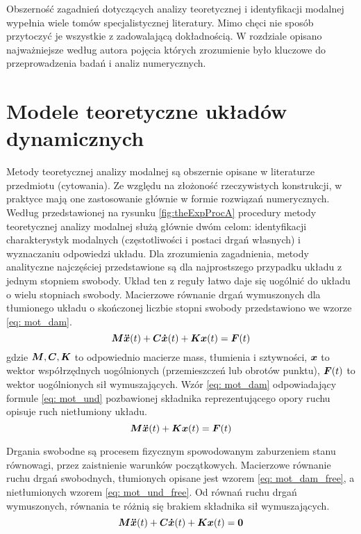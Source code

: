 Obszerność zagadnień dotyczących analizy teoretycznej i identyfikacji modalnej wypełnia wiele tomów specjalistycznej literatury. Mimo chęci nie sposób przytoczyć je wszystkie z zadowalającą dokładnością. W rozdziale opisano najważniejsze według autora pojęcia których zrozumienie było kluczowe do  przeprowadzenia badań i analiz numerycznych.

\section{Modele teoretyczne układów dynamicznych}
\label{section: eigen}
Metody teoretycznej analizy modalnej są obszernie opisane w literaturze przedmiotu (cytowania). Ze względu na złożoność rzeczywistych konstrukcji, w praktyce mają one zastosowanie głównie w formie rozwiązań numerycznych.  Według przedstawionej na rysunku \ref{fig:theExpProcA} procedury metody teoretycznej analizy modalnej służą głównie dwóm celom: identyfikacji charakterystyk modalnych (częstotliwości i postaci drgań własnych) i wyznaczaniu odpowiedzi układu. Dla zrozumienia zagadnienia, metody analityczne najczęściej przedstawione są dla najprostszego przypadku układu z jednym stopniem swobody. Układ ten z reguły łatwo daje się uogólnić do układu o wielu stopniach swobody. Macierzowe równanie drgań wymuszonych dla tłumionego układu o skończonej liczbie stopni swobody przedstawiono we wzorze \ref{eq: mot_dam}. 
\begin{equation} \label{eq: mot_dam}
\bm{M} \bm{\ddot{x}}(t) +\bm{C} \bm{\dot{x}}(t)+ \bm{Kx}(t) = \bm{F}(t)
\end{equation}
gdzie $\bm{M},\bm{C},\bm{K}$ to odpowiednio macierze mass, tłumienia i sztywności, $\bm{x}$ to wektor współrzędnych uogólnionych (przemieszczeń lub obrotów punktu), $\bm{F}(t)$ to wektor uogólnionych sił wymuszających. Wzór \ref{eq: mot_dam} odpowiadający formule \ref{eq: mot_und} pozbawionej składnika reprezentującego opory ruchu opisuje ruch nietłumiony układu. 
\begin{equation} \label{eq: mot_und}
\bm{M} \bm{\ddot{x}}(t) +\bm{Kx}(t) = \bm{F}(t)
\end{equation}

Drgania swobodne są procesem fizycznym spowodowanym zaburzeniem stanu równowagi, przez zaistnienie warunków początkowych. Macierzowe równanie ruchu drgań swobodnych, tłumionych opisane jest wzorem \ref{eq: mot_dam_free}, a nietłumionych wzorem \ref{eq: mot_und_free}. Od równań ruchu drgań wymuszonych, równania te różnią się brakiem składnika sił wymuszających.
\begin{equation} \label{eq: mot_dam_free}
\bm{M} \bm{\ddot{x}}(t) +\bm{C} \bm{\dot{x}}(t)+ \bm{Kx}(t) = \bm{0}
\end{equation}

